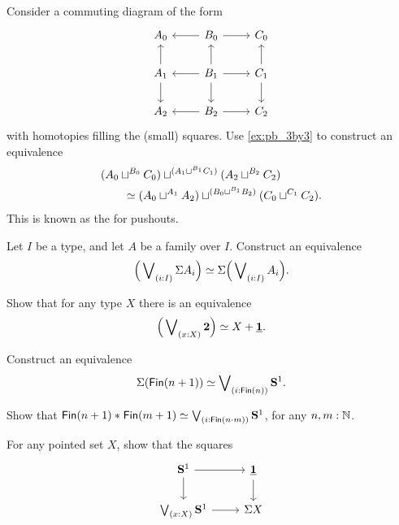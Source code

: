 \begin{exercises}
\item Consider a commuting diagram of the form
\begin{equation*}
\begin{tikzcd}
A_0 & B_0 \arrow[l] \arrow[r] & C_0 \\
A_1 \arrow[u] \arrow[d] & B_1 \arrow[u] \arrow[r] \arrow[d] \arrow[l] & C_1 \arrow[u] \arrow[d] \\
A_2 & B_2 \arrow[l] \arrow[r] & C_2
\end{tikzcd}
\end{equation*}
with homotopies filling the (small) squares. Use \cref{ex:pb_3by3} to construct an equivalence
\begin{align*}
& (A_0\sqcup^{B_0} C_0) \sqcup^{(A_1\sqcup^{B_1} C_1)} (A_2 \sqcup^{B_2} C_2) \\
& \qquad \simeq (A_0 \sqcup^{A_1} A_2) \sqcup^{(B_0\sqcup^{B_1} B_2)} (C_0\sqcup^{C_1} C_2).
\end{align*}
This is known as the  for pushouts.
\item 
\begin{subexenum}
\item Let $I$ be a type, and let $A$ be a family over $I$. Construct an equivalence
\begin{equation*}
\eqv{\Big(\bigvee\nolimits_{(i:I)}\susp A_i\Big)}{\susp\Big(\bigvee\nolimits_{(i:I)}A_i\Big)}.
\end{equation*}
\item Show that for any type $X$ there is an equivalence
\begin{equation*}
\eqv{\Big(\bigvee\nolimits_{(x:X)}\bool\Big)}{X+\unit}.
\end{equation*}
\item Construct an equivalence
\begin{equation*}
\eqv{\susp(\mathsf{Fin}(n+1))}{\bigvee\nolimits_{(i:\mathsf{Fin}(n))}\sphere{1}}.
\end{equation*}
\end{subexenum}
\item Show that $\eqv{\join{\mathsf{Fin}(n+1)}{\mathsf{Fin}(m+1)}}{\bigvee\nolimits_{(i:\mathsf{Fin}(n\cdot m))}\sphere{1}}$, for any $n,m:{\mathbb{N}}$.
\item For any pointed set $X$, show that the squares
  \begin{equation*}
    \begin{tikzcd}
      \sphere{1} \arrow[r] \arrow[d] & \unit \arrow[d] \\
      \bigvee_{(x:X)}\sphere{1} \arrow[r] & \susp{X}

\end{tikzcd}
\end{equation*}
\end{exercises}
